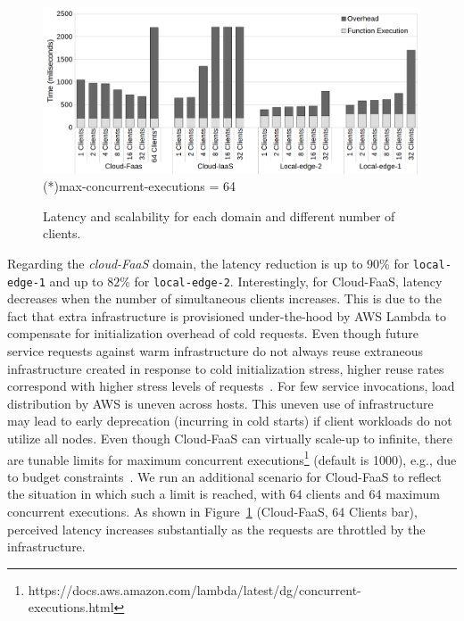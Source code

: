 \begin{figure}
	
	\centering
	\includegraphics[width=1\textwidth]{figs/latency-domain-new}
	\scriptsize{(*)max-concurrent-executions = 64}
	\vspace{-.3cm}
	\caption{Latency and scalability for each domain and different number of clients.}
	\label{fig:latency-domains}
\end{figure}

 Regarding the \textit{cloud-FaaS} domain, the latency reduction is up to $90$\% for \texttt{local-edge-1} and up to $82$\% for \texttt{local-edge-2}. Interestingly, for Cloud-FaaS, latency decreases when the number of simultaneous clients increases.
 This is due to the fact that extra infrastructure is provisioned under-the-hood by AWS Lambda to compensate for initialization overhead of cold requests. Even though future service requests against warm infrastructure do not always reuse extraneous infrastructure created in response to cold initialization stress, higher reuse rates correspond with higher stress levels of requests~\cite{Lloyd18serverless}. For few service invocations, load distribution by AWS is uneven across hosts. This uneven use of infrastructure may lead to early deprecation (incurring in cold starts) if client workloads do not utilize all nodes. 
 Even though Cloud-FaaS can virtually scale-up to infinite, there are tunable limits for maximum concurrent executions\footnote{https://docs.aws.amazon.com/lambda/latest/dg/concurrent-executions.html} (default is 1000), e.g., due to budget constraints~\cite{Villamizar2017lambda}. We run an additional scenario for Cloud-FaaS to reflect the situation in which such a limit is reached, with 64 clients and 64 maximum concurrent executions. As shown in Figure~\ref{fig:latency-domains} (Cloud-FaaS, 64 Clients bar), perceived latency increases substantially as the requests are throttled by the infrastructure.
 

